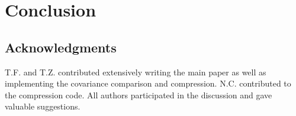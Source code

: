 \documentclass[twocolumn]{\docclass}
\begin{document}
	
	
	\section{Conclusion}
	\label{sec:conclusion}
	
	
	
	\subsection*{Acknowledgments}
	
	
	
	
	 
	
	T.F. and T.Z. contributed extensively writing the main paper as well as implementing the covariance comparison and compression. N.C. contributed to the compression code. All authors participated in the discussion and gave valuable suggestions.
	
	
	
	
	
	
	
%	
	
	
	
	
	
	
	
	
	
\end{document}

